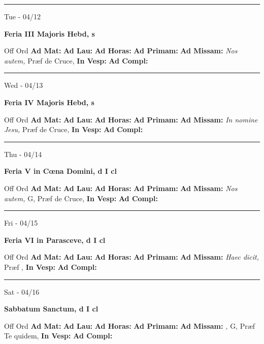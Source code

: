 \documentclass[letterpaper, 10pt]{article}
\begin{document}
\hrule
\begin{center}
Tue - 04/12
\end{center}\textbf{ \large Feria III Majoris Hebd, \textnormal{\normalsize s}}
\begin{justify}
Off Ord
\textbf{Ad Mat: }
\textbf{Ad Lau: }
\textbf{Ad Horas: }
\textbf{Ad Primam: }
\textbf{Ad Missam:} \textit{Nos autem, } Præf de Cruce, 
\textbf{In Vesp: }
\textbf{Ad Compl: }\end{justify}



\hrule
\begin{center}
Wed - 04/13
\end{center}\textbf{ \large Feria IV Majoris Hebd, \textnormal{\normalsize s}}
\begin{justify}
Off Ord
\textbf{Ad Mat: }
\textbf{Ad Lau: }
\textbf{Ad Horas: }
\textbf{Ad Primam: }
\textbf{Ad Missam:} \textit{In nomine Jesu, } Præf de Cruce, 
\textbf{In Vesp: }
\textbf{Ad Compl: }\end{justify}



\hrule
\begin{center}
Thu - 04/14
\end{center}\textbf{ \large Feria V in Cœna Domini, \textnormal{\normalsize d I cl}}
\begin{justify}
Off Ord
\textbf{Ad Mat: }
\textbf{Ad Lau: }
\textbf{Ad Horas: }
\textbf{Ad Primam: }
\textbf{Ad Missam:} \textit{Nos autem, } G, Præf de Cruce, 
\textbf{In Vesp: }
\textbf{Ad Compl: }\end{justify}



\hrule
\begin{center}
Fri - 04/15
\end{center}\textbf{ \large Feria VI in Parasceve, \textnormal{\normalsize d I cl}}
\begin{justify}
Off Ord
\textbf{Ad Mat: }
\textbf{Ad Lau: }
\textbf{Ad Horas: }
\textbf{Ad Primam: }
\textbf{Ad Missam:} \textit{Haec dicit, } Præf , 
\textbf{In Vesp: }
\textbf{Ad Compl: }\end{justify}



\hrule
\begin{center}
Sat - 04/16
\end{center}\textbf{ \large Sabbatum Sanctum, \textnormal{\normalsize d I cl}}
\begin{justify}
Off Ord
\textbf{Ad Mat: }
\textbf{Ad Lau: }
\textbf{Ad Horas: }
\textbf{Ad Primam: }
\textbf{Ad Missam:} \textit{, } G, Præf Te quidem, 
\textbf{In Vesp: }
\textbf{Ad Compl: }\end{justify}
\end{document}
